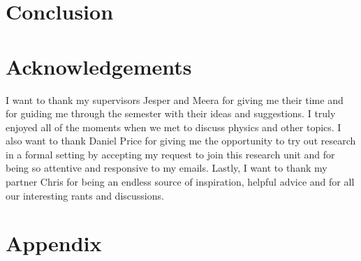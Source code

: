 \documentclass[10pt, a4paper, singlespacing, headsepline]{report}
\begin{document}





\chapter{Conclusion}\label{Conclusion}

\chapter{Acknowledgements}\label{Acknowledgements}
I want to thank my supervisors Jesper and Meera for giving me their time and for guiding me through the semester with their ideas and suggestions. I truly enjoyed all of the moments when we met to discuss physics and other topics. I also want to thank Daniel Price for giving me the opportunity to try out research in a formal setting by accepting my request to join this research unit and for being so attentive and responsive to my emails. Lastly, I want to thank my partner Chris for being an endless source of inspiration, helpful advice and for all our interesting rants and discussions. 

\chapter{Appendix}\label{Appendix}

\end{document}
